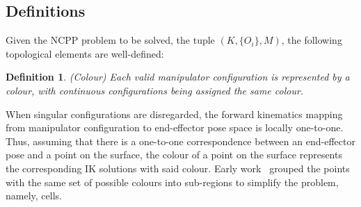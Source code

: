 \documentclass[journal]{IEEEtran}
\newtheorem{definition}[theorem]{Definition}
\begin{document}
\subsection{Definitions}
Given the NCPP problem to be solved, the tuple $(K, \{O_i\}, M)$, the following topological elements are well-defined: 
\begin{definition}
(Colour) Each valid manipulator configuration is represented by a colour, with continuous configurations being assigned the same colour. 
\end{definition}
When singular configurations are disregarded, the forward kinematics mapping from manipulator configuration to end-effector pose space is locally one-to-one. 
Thus, assuming that there is a one-to-one correspondence between an end-effector pose and a point on the surface, the colour of a point on the surface represents the corresponding IK solutions with said colour. 
Early work~\cite{Yang2020Cellular} grouped the points with the same set of possible colours into sub-regions to simplify the problem, namely, cells. 
\end{document}
